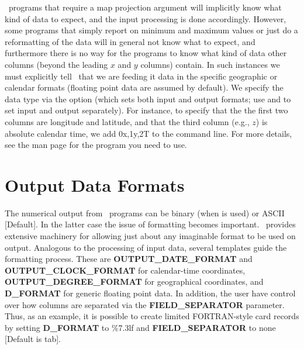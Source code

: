 \GMT\ programs that require a map projection argument will implicitly know what kind of data to expect, and the
input processing is done accordingly.  However, some programs that simply report on minimum and maximum
values or just do a reformatting of the data will in general not know what to expect, and furthermore there is
no way for the programs to know what kind of data other columns (beyond the leading $x$ and $y$ columns) contain.
In such instances we must
explicitly tell \GMT\ that we are feeding it data in the specific geographic or calendar formats (floating point
data are assumed by default).  We specify the data type via the  option (which sets both input and output
formats; use  and  to set input and output separately).  For instance, to specify that the
the first two columns are longitude and latitude, and that the third column (e.g., $z$) is absolute calendar time, we add
0x,1y,2T to the command line.  For more details, see the man page for the program you need to use.

\section{Output Data Formats}

The numerical output from \GMT\ programs can be binary (when  is used) or ASCII [Default].
In the latter case the issue of formatting becomes important.  \GMT\ provides extensive
machinery for allowing just about any imaginable format to be used on output.  Analogous to
the processing of input data, several templates guide the formatting process.  These are
\textbf{OUTPUT\_DATE\_FORMAT} and \textbf{OUTPUT\_CLOCK\_FORMAT} for calendar-time coordinates,
\textbf{OUTPUT\_DEGREE\_FORMAT} for geographical coordinates, and \textbf{D\_FORMAT} for generic
floating point data.  In addition, the user have control over how columns are separated via
the \textbf{FIELD\_SEPARATOR} parameter.  Thus, as an example, it is possible to create limited
FORTRAN-style card records by setting \textbf{D\_FORMAT} to \%7.3lf and \textbf{FIELD\_SEPARATOR} to
none [Default is tab].


